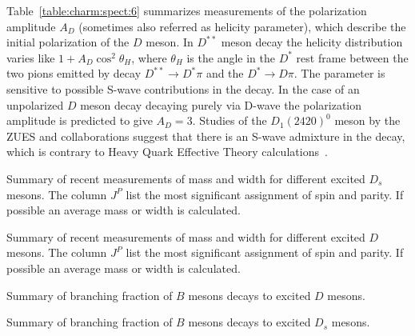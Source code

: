Table~\ref{table:charm:spect:6} summarizes measurements of the polarization amplitude $A_{D}$ (sometimes also referred as helicity parameter), which describe the initial polarization of the $D$ meson. In $D^{\ast\ast}$ meson decay the helicity distribution varies like $1 + A_{D}\cos^{2}\theta_{H}$, where $\theta_{H}$ is the angle in the $D^{\ast}$ rest frame between the two pions emitted by decay $D^{\ast\ast} \to D^{\ast}\pi$ and the $D^{\ast} \to D \pi$. The parameter is sensitive to possible S-wave contributions in the decay. In the case of an unpolarized $D$ meson decay decaying purely via D-wave the polarization amplitude is predicted to give $A_{D}=3$. 
Studies of the $D_{1}(2420)^{0}$ meson by the ZUES and \babar{} collaborations suggest that there is an S-wave admixture in the decay, which is  contrary to Heavy Quark Effective Theory calculations~\cite{Isgur:1989vq,Neubert:1993mb}.

\begin{table}[htb!]

\caption{\label{table:charm:spect:1} Summary of recent measurements of mass and width for different excited $D_{s}$ mesons. The column $J^{P}$ list the most significant assignment of spin and parity. If possible an average mass or width is calculated.}
\end{table} 

\begin{table}[htb!]

\caption{\label{tabel:charm:spect:2} Summary of recent measurements of mass and width for different excited $D$ mesons. The column $J^{P}$ list the most significant assignment of spin and parity. If possible an average mass or width is calculated.}
\end{table} 


\begin{table}[htb!]
\begin{center}

\caption{\label{table:charm:spect:3} Summary of branching fraction of $B$ mesons decays to excited $D$ mesons.}
\end{center}
\end{table} 

\begin{table}[htb!]
\begin{center}

\caption{\label{table:charm:spect:4} Summary of branching fraction of $B$ mesons decays to excited $D_{s}$ mesons.}
\end{center}
\end{table} 


